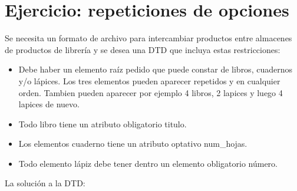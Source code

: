 \documentclass[letterpaper,10pt,spanish]{sphinxmanual}
\begin{document}
\section{Ejercicio: repeticiones de opciones}
\label{\detokenize{tema5:ejercicio-repeticiones-de-opciones}}
Se necesita un formato de archivo para intercambiar productos entre almacenes de productos de librería y se desea una DTD que incluya estas restricciones:
\begin{itemize}
\item {} 
Debe haber un elemento raíz pedido que puede constar de libros, cuadernos y/o lápices. Los tres elementos pueden aparecer repetidos y en cualquier orden. Tambien pueden aparecer por ejemplo 4 libros, 2 lapices y luego 4 lapices de nuevo.

\item {} 
Todo libro tiene un atributo obligatorio titulo.

\item {} 
Los elementos cuaderno tiene un atributo optativo num\_hojas.

\item {} 
Todo elemento lápiz debe tener dentro un  elemento obligatorio número.

\end{itemize}

La solución a la DTD:

\begin{sphinxVerbatim}[commandchars=\\\{\}]
  
  
    
  
    
  
  
\end{sphinxVerbatim}
\end{document}
